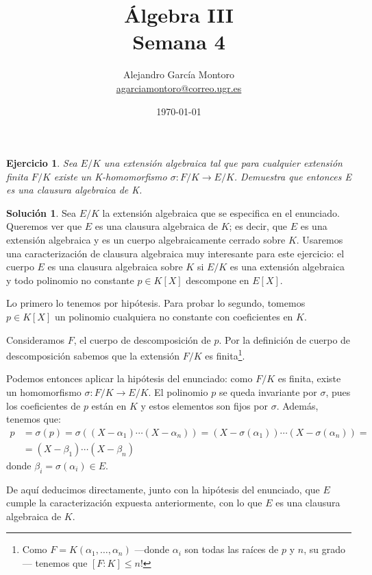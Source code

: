 \documentclass[a4paper, 11pt]{article}
\title{Álgebra III \\ Semana 4}
\author{Alejandro García Montoro\\
    \href{mailto:agarciamontoro@correo.ugr.es}{agarciamontoro@correo.ugr.es}}
\date{\today}
\newtheorem{ejercicio}{Ejercicio}
\theoremstyle{definition}
\newtheorem*{solucion}{Solución}
\theoremstyle{remark}
\begin{document}
  \maketitle

  \begin{ejercicio}
      Sea $E/K$ una extensión algebraica tal que para cualquier extensión finita $F/K$ existe un K-homomorfismo $\sigma:F/K\to E/K$. Demuestra  que entonces E es una clausura algebraica de K.
  \end{ejercicio}

  \begin{solucion}
      Sea $E/K$ la extensión algebraica que se especifica en el enunciado. Queremos ver que $E$ es una clausura algebraica de $K$; es decir, que $E$ es una extensión algebraica y es un cuerpo algebraicamente cerrado sobre $K$. Usaremos una caracterización de clausura algebraica muy interesante para este ejercicio: el cuerpo $E$ es una clausura algebraica sobre $K$ si $E/K$ es una extensión algebraica y todo polinomio no constante $p\in K[X]$ descompone en $E[X]$.

      Lo primero lo tenemos por hipótesis. Para probar lo segundo, tomemos $p\in K[X]$ un polinomio cualquiera no constante con coeficientes en $K$.

      Consideramos $F$, el cuerpo de descomposición de $p$. Por la definición de cuerpo de descomposición sabemos que la extensión $F/K$ es finita\footnote{Como $F=K(\alpha_1,\dots,\alpha_n)$ ---donde $\alpha_i$ son todas las raíces de $p$ y $n$, su grado--- tenemos que $[F:K]\leq n!$}.

      Podemos entonces aplicar la hipótesis del enunciado: como $F/K$ es finita, existe un homomorfismo $\sigma : F/K \to E/K$. El polinomio $p$ se queda invariante por $\sigma$, pues los coeficientes de $p$ están en $K$ y estos elementos son fijos por $\sigma$. Además, tenemos que:
      \begin{align*}
          p &= \sigma(p) = \sigma\left((X-\alpha_1)\cdots(X-\alpha_n)\right) = (X-\sigma(\alpha_1))\cdots(X-\sigma(\alpha_n)) = \\
          &= (X-\beta_1)\cdots(X-\beta_n)
      \end{align*}
      donde $\beta_i = \sigma(\alpha_i) \in E$.

      De aquí deducimos directamente, junto con la hipótesis del enunciado, que $E$ cumple la caracterización expuesta anteriormente, con lo que $E$ es una clausura algebraica de $K$.
  \end{solucion}
\end{document}
